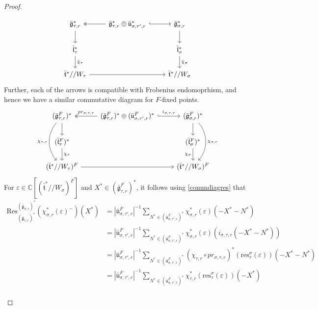 \documentclass[11 pt]{article}
\numberwithin{equation}{subsection}
\theoremstyle{definition}
\theoremstyle{remark}
\theoremstyle{conjecture}
\newcommand{\bt}{\bar{\mathfrak t}}
\newcommand{\bg}{\bar{\mathfrak g}}
\newcommand{\bu}{\bar{\mathfrak u}}
\newcommand{\bl}{\bar{\mathfrak l}}
\newcommand{\Res}{\mathrm{Res}}
\newcommand{\res}{\mathrm{res}}
\newcommand{\C}{\mathbb C}
\begin{document}
\begin{proof}
\begin{itemize}
    \begin{equation*}
        \begin{tikzcd}
          \bg_{\tau,r}^* \arrow{d} & \bg_{\tau,r}^* \oplus \bu^*_{\sigma,\tau',r} \arrow[twoheadrightarrow]{l}\arrow[hookrightarrow]{r} & \bg^*_{\sigma,r} \arrow{d}\\
          \bl_\tau^* \arrow{d}{\bar\chi_\tau} && \bl^*_\sigma \arrow{d}{\bar\chi_\sigma}\\
           \bt^* // W_\tau \arrow[rr] && \bt^* // W_\sigma
        \end{tikzcd}
    \end{equation*}
    Further, each of the arrows is compatible with Frobenius endomoprhism, and hence we have a similar commutative diagram for $F$-fixed points. 
 \begin{equation}\label{commdiagres}
        \begin{tikzcd}
          (\bg_{\tau,r}^F)^* \arrow[dd, bend right=40, "\chi_{\tau,r}"']\arrow{d} & (\bg_{\tau,r}^F)^* \oplus (\bu^F_{\sigma,\tau',r})^* \arrow[twoheadrightarrow]{l}[swap]{pr_{\sigma,\tau,r}}\arrow[hookrightarrow]{r}{i_{\sigma,\tau,r}} & (\bg^F_{\sigma,r})^* \arrow{d}\arrow[dd, bend left=40, "\chi_{\sigma,r}"]\\
          (\bl_\tau^F)^*\arrow{d}{\chi_\tau} && (\bl^F_\sigma)^*\arrow{d}[swap]{\chi_\sigma}\\
           (\bt^* // W_\tau)^F\arrow[rr] && (\bt^* // W_\sigma)^F
        \end{tikzcd}
    \end{equation}
   For $\varepsilon \in \C[(\bt^*//W_\sigma)^F] $ and $X^* \in (\bg_{\tau,r}^F)^*$, it follows using \eqref{commdiagres} that 
    \begin{align*}
        \Res^{(\bg_{\sigma,r})^*}_{(\bg_{\tau,r})^*}(\chi_{\sigma,r}^*(\varepsilon)^-)(X^*)&=\left|\bu_{\sigma,\tau',r}^F\right|^{-1}\sum_{N^* \in (\bu_{\sigma,\tau',r}^F)^*} \chi_{\sigma,r}^*(\varepsilon)(-X^*-N^*)\\
        &=\left|\bu_{\sigma,\tau',r}^F\right|^{-1}\sum_{N^* \in (\bu_{\sigma,\tau',r}^F)^*} \chi_{\sigma,r}^*(\varepsilon)(i_{\sigma,\tau,r}(-X^*-N^*))\\
        &=\left|\bu_{\sigma,\tau',r}^F\right|^{-1}\sum_{N^* \in (\bu_{\sigma,\tau',r}^F)^*} (\chi_{\tau,r}\circ pr_{\sigma,\tau,r})^*(\res^\sigma_\tau(\varepsilon))(-X^*-N^*)\\
        &=\left|\bu_{\sigma,\tau',r}^F\right|^{-1}\sum_{N^* \in (\bu_{\sigma,\tau',r}^F)^*}\chi_{\tau,r}^*(\res^\sigma_\tau(\varepsilon))(-X^*)\\

\end{align*}
\end{itemize}
\end{proof}
\end{document}
